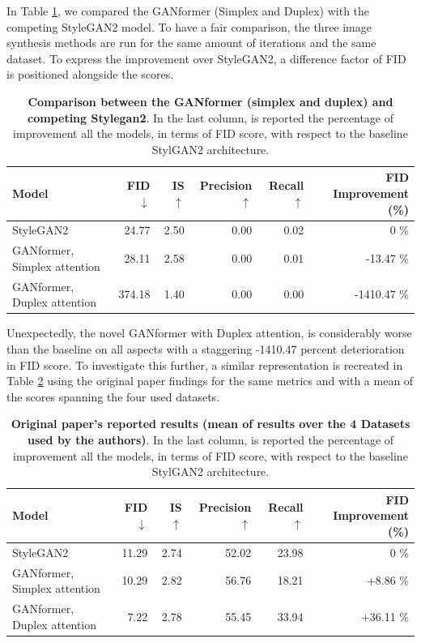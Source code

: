 \documentclass{article}
\begin{document}
	In Table \ref{tab:our-results}, we compared the GANformer (Simplex and Duplex) with the competing 
	StyleGAN2 model. To have a fair comparison, the three image synthesis methods are run for the 
	same amount of iterations and the same dataset.
	To express the improvement over StyleGAN2, a difference factor of FID is positioned alongside the 
	scores.
	\begin{table}[htb]
    	\centering
		\caption{\textbf{Comparison between the GANformer (simplex and duplex) and competing 
		Stylegan2}.  In the last column, is reported the percentage of improvement all the models, in terms 
			of FID score, with respect to the baseline StylGAN2 architecture.}
		\label{tab:our-results}
		\vspace{3mm}
		\small
		\begin{tabular}{l|rrrrr}
			\toprule
			Model                        & FID $\downarrow$  & IS $\uparrow$& Precision$\uparrow$  & Recall 
			$\uparrow$& FID Improvement (\%)\\ 
			\midrule
			StyleGAN2                    &  24.77 & 2.50 & 0.00 & 0.02 & 0 \%\\ 
			GANformer, Simplex attention & 28.11 & 2.58 & 0.00 & 0.01 & -13.47 \%\\ 
			GANformer, Duplex attention  & 374.18 & 1.40 & 0.00 & 0.00 & -1410.47 \% \\ 
			\bottomrule
		\end{tabular}
	\end{table}
	
	Unexpectedly, the novel GANformer with Duplex attention, is considerably worse than the baseline on all aspects with a staggering -1410.47 percent deterioration in FID score.
	To investigate this further, a similar representation is recreated in Table \ref{tab:orig-results} using 
	the original paper findings for the same metrics and with a mean of the scores spanning the four 
	used datasets.
	\begin{table}[htb]
    	\centering
        \caption{\textbf{Original paper's reported results (mean of results over the 4 Datasets used by the 
        authors)}. In the last column, is reported the percentage of improvement all the models, in terms 
        of FID score, with respect to the baseline StylGAN2 architecture.}
        \label{tab:orig-results}
        \vspace{3mm}
        \small
        \begin{tabular}{l|rrrrr}
	        \toprule
	        Model           & FID  $\downarrow$ & IS $\uparrow$& Precision $\uparrow$ & Recall 
	        $\uparrow$& {FID Improvement (\%)}\\ 
	        \midrule
	        StyleGAN2                    & 11.29 & 2.74 & 52.02      & 23.98 & 0 \% \\ 
	        {GANformer, Simplex attention} & 10.29 & 2.82   & 56.76     & 18.21  & 
	        +8.86 \% \\ 
	        {GANformer, Duplex attention}  & 7.22   & 2.78 & 55.45     & 33.94 & +36.11 \%
	        \\ 
	        \bottomrule
        \end{tabular}
        \end{table}
	
\end{document}
